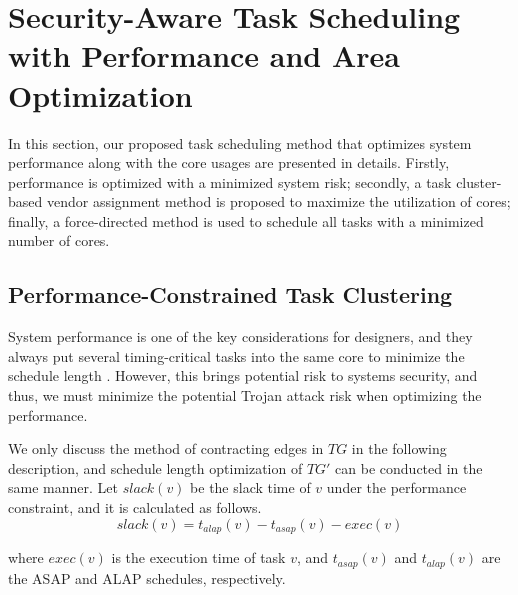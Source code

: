 \documentclass[10pt,journal]{IEEEtran}
\begin{document}




\section{Security-Aware Task Scheduling with Performance and Area Optimization}

In this section, our proposed task scheduling method that optimizes system performance along with the core usages are presented in details. Firstly, performance is optimized with a minimized system risk; secondly, a task cluster-based vendor assignment method is proposed to maximize the utilization of cores; finally, a force-directed method is used to schedule all tasks with a minimized number of cores.

\subsection{Performance-Constrained Task Clustering}
System performance is one of the key considerations for designers, and they always put several timing-critical tasks into the same core to minimize the schedule length \cite{article:CL} \cite{article:NW}. However, this brings potential risk to systems security, and thus, we must minimize the potential Trojan attack risk when optimizing the performance.%

We only discuss the method of contracting edges in $TG$ in the following description, and schedule length optimization of $TG'$ can be conducted in the same manner. Let $slack(v)$ be the slack time of $v$ under the performance constraint, and it is calculated as follows.
\begin{equation}
slack(v) = t_{alap}(v)-t_{asap}(v)-exec(v)
\end{equation}

\noindent where $exec(v)$ is the execution time of task $v$, and $t_{asap}(v)$ and $t_{alap}(v)$ are the ASAP and ALAP schedules, respectively.%
\end{document}
